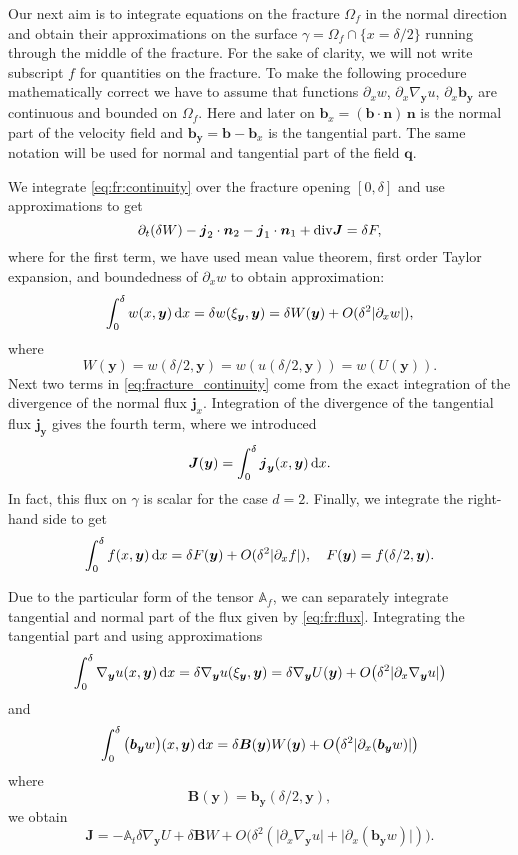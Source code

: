 \documentclass[12pt,a4paper]{report}
\def\prtl{\partial}
\def\vc#1{\mathbf{\boldsymbol{#1}}}     %
\def\tn#1{{\mathbb{#1}}}    %
\def\abs#1{\lvert#1\rvert}
\def\div{{\rm div}}
\def\grad{\nabla}
\def\d {\,{\rm d}}
\begin{document}
Our next aim is to integrate equations on the fracture $\Omega_f$ in the normal direction 
and obtain their approximations on the surface $\gamma=\Omega_f \cap \{x=\delta/2\}$ running through the middle of the fracture. 
For the sake of clarity, we will not write subscript $f$ for quantities on the fracture. 
To make the following procedure mathematically correct we have to assume that functions
$\prtl_x w$, $\prtl_x \grad_{\vc y} u$, $\prtl_x \vc b_{\vc y}$ are continuous and bounded on $\Omega_f$. Here and later on 
$\vc b_x=(\vc b \cdot \vc n)\, \vc n$ is the normal part of the velocity field and $\vc b_{\vc y} = \vc b - \vc b_x$ is the tangential part.
The same notation will be used for normal and tangential part of the field $\vc q$.

We integrate \eqref{eq:fr:continuity} over the fracture opening $[0,\delta]$ and use approximations to get
\begin{equation}
    \label{eq:fracture_continuity}
   \prtl_t (\delta W) - \vc j_2 \cdot \vc n_2 - \vc j_1 \cdot \vc n_1 + \div \vc J = \delta F,
\end{equation}
where for the first term, we have used mean value theorem, first order Taylor expansion, 
and boundedness of $\prtl_x w$ to obtain approximation:
\[
    \int_0^\delta w(x,\vc y) \d x=\delta w(\xi_{\vc y}, \vc y) = \delta W(\vc y) + O(\delta^2\abs{\prtl_x w}),
\]
where
\[
    W(\vc y)=w(\delta / 2,\vc y)=w(u(\delta/2,\vc y))=w(U(\vc y)).
\]
Next two terms in \eqref{eq:fracture_continuity} come from the exact integration 
of the divergence of the normal flux $\vc j_x$.
Integration of the divergence of the tangential flux $\vc j_{\vc y}$ gives the fourth term, where we introduced
\[
\vc J(\vc y) = \int_0^\delta \vc j_{\vc y}(x, \vc y) \d x.
\]
In fact, this flux on $\gamma$ is scalar for the case $d=2$. Finally, we integrate the right-hand side to get 
\[
    \int_0^\delta f(x,\vc y) \d x = \delta F(\vc y) + O(\delta^2\abs{\prtl_x f}),\quad F(\vc y)=f(\delta/2,\vc y). 
\]


Due to the particular form of the tensor $\tn A_f$, we can separately integrate tangential and normal
part of the flux given by \eqref{eq:fr:flux}. Integrating the tangential part and using approximations
\[
    \int_0^\delta  \grad_{\vc y} u(x, \vc y) \d x = \delta \grad_{\vc y} u (\xi_{\vc y}, \vc y) 
    = \delta \grad_{\vc y} U( \vc y) + O\big( \delta^2 \abs{\prtl_x\grad_{\vc y} u} \big) 
\]
and
\[
 \int_0^\delta \big(\vc b_{\vc y} w\big)(x, \vc y) \d x 
  = \delta \vc B(\vc y) W(\vc y) + O\big(\delta^2 \abs{\prtl_x(\vc b_{\vc y} w)} \big)
\]
where
\[
  \vc B(\vc y) = \vc b_{\vc y}(\delta/2, \vc y),
\]
we obtain
\begin{equation}
    \label{eq:fracture_darcy}
   \vc J = -\tn A_t \delta \grad_{\vc y} U + \delta \vc B W + O\big(\delta^2(\abs{\prtl_x\grad_{\vc y} u}+\abs{\prtl_x(\vc b_{\vc y} w)})\big).
\end{equation}
\end{document}
